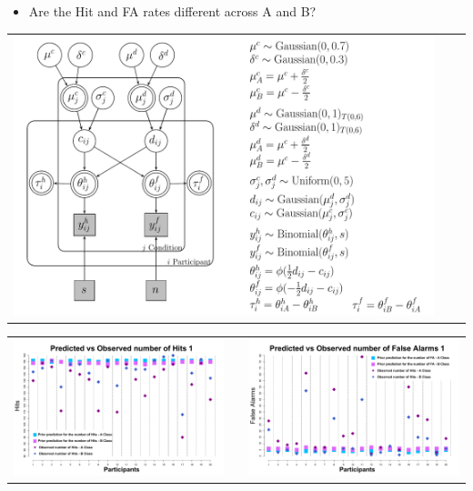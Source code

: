 \documentclass[final]{beamer}
\newlength{\onecolwid}
\newlength{\twocolwid}
\begin{document}
\begin{frame}[t]
\begin{columns}[t]
\begin{column}{\twocolwid}
\begin{columns}[t,totalwidth=\twocolwid]
\begin{column}{\onecolwid}
\begin{alertblock}{}
\begin{itemize}
\item Are the Hit and FA rates different across A and B?\\
\end{itemize}
\begin{center}
\begin{tabular}{ccc}
\includegraphics[width=0.99\linewidth]{Figures/3_Taus.pdf}
\end{tabular}
\end{center}

\begin{center}
\begin{tabular}{ccc}
\includegraphics[width=0.47\linewidth]{Figures/3-PredictionsH.pdf} & \hfill & \includegraphics[width=0.47\linewidth]{Figures/3-PredictionsF.pdf}
\end{tabular}
\end{center}


\end{alertblock}
\end{column}
\end{columns}
\end{column}
\end{columns}
\end{frame}
\end{document}
